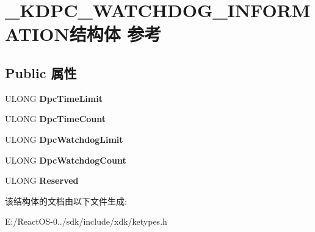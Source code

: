 \hypertarget{struct___k_d_p_c___w_a_t_c_h_d_o_g___i_n_f_o_r_m_a_t_i_o_n}{}\section{\+\_\+\+K\+D\+P\+C\+\_\+\+W\+A\+T\+C\+H\+D\+O\+G\+\_\+\+I\+N\+F\+O\+R\+M\+A\+T\+I\+O\+N结构体 参考}
\label{struct___k_d_p_c___w_a_t_c_h_d_o_g___i_n_f_o_r_m_a_t_i_o_n}
\subsection*{Public 属性}
\begin{DoxyCompactItemize}
\item 
\mbox{\label{struct___k_d_p_c___w_a_t_c_h_d_o_g___i_n_f_o_r_m_a_t_i_o_n_ac0884fecf2474386c11c560d5c9026fa}} 
U\+L\+O\+NG {\bfseries Dpc\+Time\+Limit}
\item 
\mbox{\label{struct___k_d_p_c___w_a_t_c_h_d_o_g___i_n_f_o_r_m_a_t_i_o_n_a7373242df4d994b00f211a3246931f8f}} 
U\+L\+O\+NG {\bfseries Dpc\+Time\+Count}
\item 
\mbox{\label{struct___k_d_p_c___w_a_t_c_h_d_o_g___i_n_f_o_r_m_a_t_i_o_n_ad2a91e909e9049a36521181497ae554a}} 
U\+L\+O\+NG {\bfseries Dpc\+Watchdog\+Limit}
\item 
\mbox{\label{struct___k_d_p_c___w_a_t_c_h_d_o_g___i_n_f_o_r_m_a_t_i_o_n_aa02c07f07141835f269933f643242f29}} 
U\+L\+O\+NG {\bfseries Dpc\+Watchdog\+Count}
\item 
\mbox{\label{struct___k_d_p_c___w_a_t_c_h_d_o_g___i_n_f_o_r_m_a_t_i_o_n_aacd5d6dc5ee7bc72a26607edfd6f9642}} 
U\+L\+O\+NG {\bfseries Reserved}
\end{DoxyCompactItemize}


该结构体的文档由以下文件生成\+:\begin{DoxyCompactItemize}
\item 
E\+:/\+React\+O\+S-\/0../sdk/include/xdk/ketypes.\+h\end{DoxyCompactItemize}
